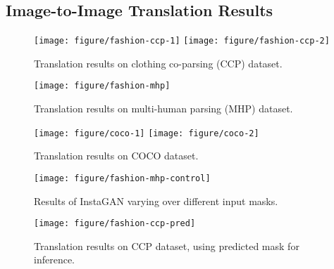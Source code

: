 \documentclass{article} \usepackage{iclr2019_conference,times}
\begin{document}
\vspace{-0.025in}
\subsection{Image-to-Image Translation Results}
\label{sec:exp-qualitative}
\vspace{-0.025in}

\begin{figure}[t]
    \vspace{-0.2in}
	\centering
	\texttt{[image: figure/fashion-ccp-1]}
	\texttt{[image: figure/fashion-ccp-2]}
	\caption{
	Translation results on clothing co-parsing (CCP) \citep{yang2014clothing} dataset.
	} \label{fig:fashion-ccp}
    \vspace{0.05in}
	\texttt{[image: figure/fashion-mhp]}
	\caption{
	Translation results on multi-human parsing (MHP) \citep{zhao2018understanding} dataset.
	} \label{fig:fashion-mhp}	
    \vspace{0.05in}
	\texttt{[image: figure/coco-1]}
	\texttt{[image: figure/coco-2]}
	\caption{
	Translation results on COCO \citep{lin2014microsoft} dataset.
	} \label{fig:coco}
	\vspace{-0.1in}
\end{figure}

\begin{figure}[t]
    \vspace{-0.2in}
	\centering
	\texttt{[image: figure/fashion-mhp-control]}
	\caption{
	Results of InstaGAN varying over different input masks.
	} \label{fig:fashion-mhp-control}
	\vspace{0.05in}
	\texttt{[image: figure/fashion-ccp-pred]}
	\caption{
	Translation results on CCP dataset, using predicted mask for inference.
	} \label{fig:fashion-ccp-pred}
    \vspace{-0.1in}
\end{figure}
\end{document}
